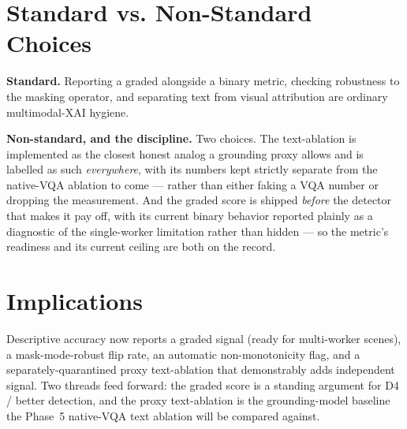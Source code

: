 \section{Standard vs. Non-Standard Choices}

\textbf{Standard.} Reporting a graded alongside a binary metric, checking robustness to the masking
operator, and separating text from visual attribution are ordinary multimodal-XAI hygiene.

\textbf{Non-standard, and the discipline.} Two choices. The text-ablation is implemented as the closest
honest analog a grounding proxy allows and is labelled as such \emph{everywhere}, with its numbers kept
strictly separate from the native-VQA ablation to come --- rather than either faking a VQA number or
dropping the measurement. And the graded score is shipped \emph{before} the detector that makes it
pay off, with its current binary behavior reported plainly as a diagnostic of the single-worker
limitation rather than hidden --- so the metric's readiness and its current ceiling are both on the
record.

\section{Implications}

Descriptive accuracy now reports a graded signal (ready for multi-worker scenes), a mask-mode-robust
flip rate, an automatic non-monotonicity flag, and a separately-quarantined proxy text-ablation that
demonstrably adds independent signal. Two threads feed forward: the graded score is a standing argument
for D4 / better detection, and the proxy text-ablation is the grounding-model baseline the Phase~5
native-VQA text ablation will be compared against.
